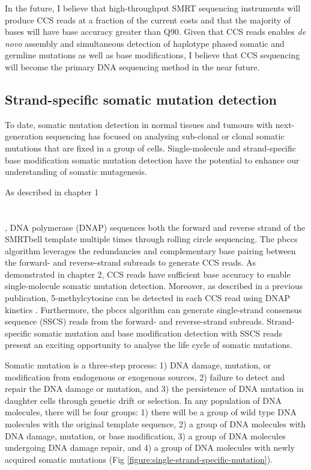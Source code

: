 In the future, I believe that high-throughput SMRT sequencing instruments will produce CCS reads at a fraction of the current costs and that the majority of bases will have base accuracy greater than Q90. Given that CCS reads enables \textit{de novo} assembly and simultaneous detection of haplotype phased somatic and germline mutations as well as base modifications, I believe that CCS sequencing will become the primary DNA sequencing method in the near future. 

\subsection{Strand-specific somatic mutation detection}

To date, somatic mutation detection in normal tissues and tumours with next-generation sequencing has focused on analysing sub-clonal or clonal somatic mutations that are fixed in a group of cells. Single-molecule and strand-specific base modification somatic mutation detection have the potential to enhance our understanding of somatic mutagenesis.

As described in chapter 1 \section{}, DNA polymerase (DNAP) sequences both the forward and reverse strand of the SMRTbell template multiple times through rolling circle sequencing. The pbccs algorithm leverages the redundancies and complementary base pairing between the forward- and reverse-strand subreads to generate CCS reads. As demonstrated in chapter 2, CCS reads have sufficient base accuracy to enable single-molecule somatic mutation detection. Moreover, as described in a previous publication, 5-methylcytosine can be detected in each CCS read using DNAP kinetics \cite{Tse2021-or, Vong2019-bi}. Furthermore, the pbccs algorithm can generate single-strand consensus sequence (SSCS) reads from the forward- and reverse-strand subreads. Strand-specific somatic mutation and base modification detection with SSCS reads present an exciting opportunity to analyse the life cycle of somatic mutations.

Somatic mutation is a three-step process: 1) DNA damage, mutation, or modification from endogenous or exogenous sources, 2) failure to detect and repair the DNA damage or mutation, and 3) the persistence of DNA mutation in daughter cells through genetic drift or selection. In any population of DNA molecules, there will be four groups: 1) there will be a group of wild type DNA molecules with the original template sequence, 2) a group of DNA molecules with DNA damage, mutation, or base modification, 3) a group of DNA molecules undergoing DNA damage repair, and 4) a group of DNA molecules with newly acquired somatic mutations (Fig \ref{figure:single-strand-specific-mutation}). 

